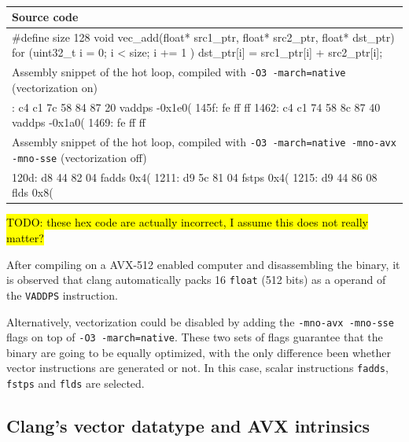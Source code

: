 \documentclass[logo,bsc,singlespacing,parskip]{infthesis}
\newenvironment{VerbatimCompact}
  {\vspace*{-2.5mm}\VerbatimEnvironment
   \par\Verbatim}
  {\endVerbatim\vspace*{-2.4mm}}
\begin{document}
\begin{table}[ht]\captionsetup{name=Listing}
\begin{tabular}{>{\raggedright\arraybackslash}p{14cm}}
    Source code\\
    \midrule
    \begin{VerbatimCompact}
#define size 128
void vec_add(float* src1_ptr, float* src2_ptr, float* dst_ptr) {
    for (uint32_t i = 0; i < size; i += 1 ){
        dst_ptr[i] = src1_ptr[i] + src2_ptr[i];
    }
}
    \end{VerbatimCompact}
    \\

    Assembly snippet of the hot loop, compiled with \texttt{-O3 -march=native}
    (vectorization on)\\
    \midrule
    \begin{VerbatimCompact}
1458: c4 c1 7c 58 84 87 20   vaddps -0x1e0(%
145f: fe ff ff
1462: c4 c1 74 58 8c 87 40   vaddps -0x1a0(%
1469: fe ff ff
    \end{VerbatimCompact}
    \\

    Assembly snippet of the hot loop, compiled with \texttt{-O3 -march=native
    -mno-avx -mno-sse} (vectorization off)\\
    \midrule
    \begin{VerbatimCompact}
120d: d8 44 82 04    fadds  0x4(%
1211: d9 5c 81 04    fstps  0x4(%
1215: d9 44 86 08    flds   0x8(%
    \end{VerbatimCompact}
\end{tabular}
\caption{}
\label{vec-add-float-auto}
\end{table}
\hl{TODO: these hex code are actually incorrect, I assume this does not really matter?}

After compiling on a AVX-512 enabled computer and disassembling the binary, it
is observed that clang automatically packs 16 \texttt{float} (512 bits) as a
operand of the \texttt{VADDPS} instruction. 

Alternatively, vectorization could be disabled by adding the \texttt{-mno-avx
-mno-sse} flags on top of \texttt{-O3 -march=native}. These two sets of flags
guarantee that the binary are going to be equally optimized, with the only
difference been whether vector instructions are generated or not. In this case,
scalar instructions \texttt{fadds}, \texttt{fstps} and \texttt{flds} are
selected.


\subsection{Clang's vector datatype and AVX intrinsics}
\end{document}

